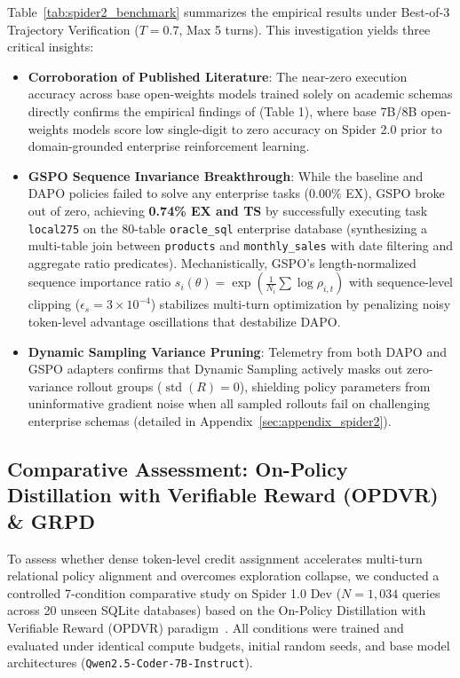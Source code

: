\documentclass{article}
\theoremstyle{plain}
\theoremstyle{definition}
\theoremstyle{remark}
\begin{document}
Table~\ref{tab:spider2_benchmark} summarizes the empirical results under Best-of-3 Trajectory Verification ($T=0.7$, Max 5 turns). This investigation yields three critical insights:
\begin{itemize}[leftmargin=*,itemsep=1pt]
    \item \textbf{Corroboration of Published Literature}: The near-zero execution accuracy across base open-weights models trained solely on academic schemas directly confirms the empirical findings of \citet{yang2026harnesssql} (Table 1), where base 7B/8B open-weights models score low single-digit to zero accuracy on Spider 2.0 prior to domain-grounded enterprise reinforcement learning.
    \item \textbf{GSPO Sequence Invariance Breakthrough}: While the baseline and DAPO policies failed to solve any enterprise tasks ($0.00\%$ EX), GSPO broke out of zero, achieving \textbf{0.74\% EX and TS} by successfully executing task \texttt{local275} on the 80-table \texttt{oracle\_sql} enterprise database (synthesizing a multi-table join between \texttt{products} and \texttt{monthly\_sales} with date filtering and aggregate ratio predicates). Mechanistically, GSPO's length-normalized sequence importance ratio $s_i(\theta) = \exp(\frac{1}{N_i}\sum \log \rho_{i,t})$ with sequence-level clipping ($\epsilon_s = 3\times 10^{-4}$) stabilizes multi-turn optimization by penalizing noisy token-level advantage oscillations that destabilize DAPO.
    \item \textbf{Dynamic Sampling Variance Pruning}: Telemetry from both DAPO and GSPO adapters confirms that Dynamic Sampling actively masks out zero-variance rollout groups ($\operatorname{std}(R)=0$), shielding policy parameters from uninformative gradient noise when all sampled rollouts fail on challenging enterprise schemas (detailed in Appendix~\ref{sec:appendix_spider2}).
\end{itemize}

\subsection{Comparative Assessment: On-Policy Distillation with Verifiable Reward (OPDVR) \& GRPD}
\label{sec:opdvr_comparative}
To assess whether dense token-level credit assignment accelerates multi-turn relational policy alignment and overcomes exploration collapse, we conducted a controlled 7-condition comparative study on Spider 1.0 Dev ($N=1,034$ queries across 20 unseen SQLite databases) based on the On-Policy Distillation with Verifiable Reward (OPDVR) paradigm~\citep{lin2026opdvr}. All conditions were trained and evaluated under identical compute budgets, initial random seeds, and base model architectures (\texttt{Qwen2.5-Coder-7B-Instruct}).
\end{document}
